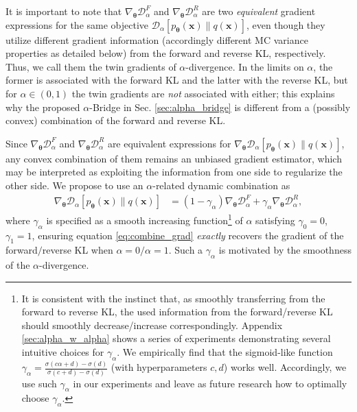 \documentclass[letterpaper]{article} %
\newcommand{\Dc}[0]{\ensuremath{\mathcal{D}} }
\newcommand{\xv}[0]{\ensuremath{\boldsymbol{x}} }
\newcommand{\thetav}[0]{\ensuremath{\boldsymbol{\theta}} }
\begin{document}
It is important to note that $\nabla_{\thetav} \Dc_{\alpha}^F$ and $\nabla_{\thetav} \Dc_{\alpha}^R$ are two {\em equivalent} gradient expressions for the same objective $\Dc_{\alpha} [p_{\thetav}(\xv) \| q(\xv)]$, even though they utilize different gradient information (accordingly different MC variance properties as detailed below) from the forward and reverse KL, respectively. Thus, we call them the twin gradients of $\alpha$-divergence. In the limits on $\alpha$, the former is associated with the forward KL and the latter with the reverse KL, but for $\alpha\in (0,1)$ the twin gradients are {\em not} associated with either; this explains why the proposed $\alpha$-Bridge in Sec. \ref{sec:alpha_bridge} is different from a (possibly convex) combination of the forward and reverse KL.

Since $\nabla_{\thetav} \Dc_{\alpha}^F$ and $\nabla_{\thetav} \Dc_{\alpha}^R$ are equivalent expressions for $\nabla_{\thetav} \Dc_{\alpha} [p_{\thetav}(\xv) \| q(\xv)]$, any convex combination of them remains an unbiased gradient estimator, which may be interpreted as exploiting the information from one side to regularize the other side. 
We propose to use an $\alpha$-related dynamic combination as 
\begin{equation}\label{eq:combine_grad}
\begin{aligned}
\nabla_{\thetav} \Dc_{\alpha} [p_{\thetav}(\xv) \| q(\xv)]
& = (1 - \gamma_{\alpha}) \nabla_{\thetav} \Dc_{\alpha}^F
+ \gamma_{\alpha} \nabla_{\thetav} \Dc_{\alpha}^R,
\end{aligned}
\end{equation}
where $\gamma_{\alpha}$ is specified as a smooth increasing function\footnote{It is consistent with the instinct that, as smoothly transferring from the forward to reverse KL, the used information from the forward/reverse KL should smoothly decrease/increase correspondingly. 
	Appendix \ref{sec:alpha_w_alpha} 
	shows a series of experiments demonstrating several intuitive choices for $\gamma_{\alpha}$. We empirically find that the sigmoid-like function $\gamma_{\alpha} = \frac{\sigma(c\alpha+d) - \sigma(d)}{\sigma(c+d)-\sigma(d)}$ (with hyperparameters $c,d$) works well.
	Accordingly, we use such $\gamma_{\alpha}$ in our experiments and leave as future research how to optimally choose $\gamma_{\alpha}$.  
} of $\alpha$ satisfying $\gamma_{0} = 0$, $\gamma_{1}=1$, ensuring equation \eqref{eq:combine_grad} \emph{exactly} recovers the gradient of the forward$/$reverse KL when $\alpha=0 / \alpha=1$.
Such a $\gamma_{\alpha}$ is motivated by the smoothness of the $\alpha$-divergence.
\end{document}
